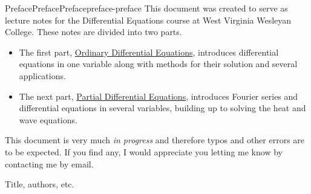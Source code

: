 \documentclass[twoside,10pt,]{book}
\numberwithin{equation}{part}
\begin{document}
\null\clearpage
%
%
\typeout{************************************************}
\typeout{************************************************}
%
\begin{preface}{Preface}{Preface}{}{Preface}{}{}{preface-preface}
This document was created to serve as lecture notes for the Differential Equations course at West Virginia Wesleyan College. These notes are divided into two parts.%
\begin{itemize}[label=\textbullet]
\item{}The first part, \hyperref[part-part-odes]{Ordinary Differential Equations}, introduces differential equations in one variable along with methods for their solution and several applications.%
\item{}The next part, \hyperref[part-part-pdes]{Partial Differential Equations}, introduces Fourier series and differential equations in several variables, building up to solving the heat and wave equations.%
\end{itemize}
%
\par
This document is very much \emph{in progress} and therefore typos and other errors are to be expected. If you find any, I would appreciate you letting me know by contacting me by email.%
\end{preface}
\setcounter{tocdepth}{1}
\renewcommand*\contentsname{Contents}
\tableofcontents
\mainmatter
     Title, authors, etc. %
%
\typeout{************************************************}
\typeout{************************************************}
%
\end{document}

